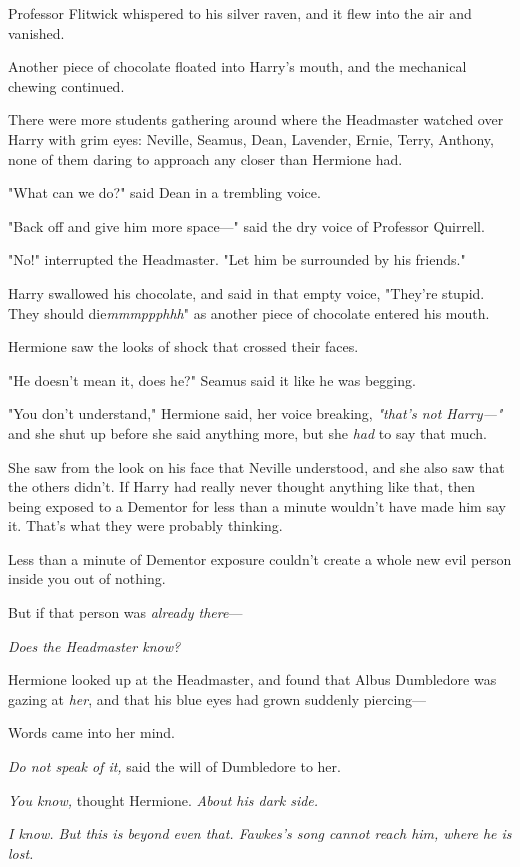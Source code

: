 Professor Flitwick whispered to his silver raven, and it flew into the air and
vanished.

Another piece of chocolate floated into Harry's mouth, and the mechanical
chewing continued.

There were more students gathering around where the Headmaster watched over
Harry with grim eyes: Neville, Seamus, Dean, Lavender, Ernie, Terry, Anthony,
none of them daring to approach any closer than Hermione had.

"What can we do?" said Dean in a trembling voice.

"Back off and give him more space\mbox{---}" said the dry voice of Professor Quirrell.

"No!" interrupted the Headmaster. "Let him be surrounded by his friends."

Harry swallowed his chocolate, and said in that empty voice, "They're stupid.
They should die\emph{mmmppphhh}" as another piece of chocolate entered his
mouth.

Hermione saw the looks of shock that crossed their faces.

"He doesn't mean it, does he?" Seamus said it like he was begging.

"You don't understand," Hermione said, her voice breaking, \emph{"that's not
Harry\mbox{---}"} and she shut up before she said anything more, but she \emph{had} to
say that much.

She saw from the look on his face that Neville understood, and she also saw
that the others didn't. If Harry had really never thought anything like that,
then being exposed to a Dementor for less than a minute wouldn't have made him
say it. That's what they were probably thinking.

Less than a minute of Dementor exposure couldn't create a whole new evil person
inside you out of nothing.

But if that person was \emph{already there}\mbox{---}

\emph{Does the Headmaster know?}

Hermione looked up at the Headmaster, and found that Albus Dumbledore was
gazing at \emph{her}, and that his blue eyes had grown suddenly piercing\mbox{---}

Words came into her mind.

\emph{Do not speak of it,} said the will of Dumbledore to her.

\emph{You know,} thought Hermione. \emph{About his dark side.}

\emph{I know. But this is beyond even that. Fawkes's song cannot reach him,
where he is lost.}

